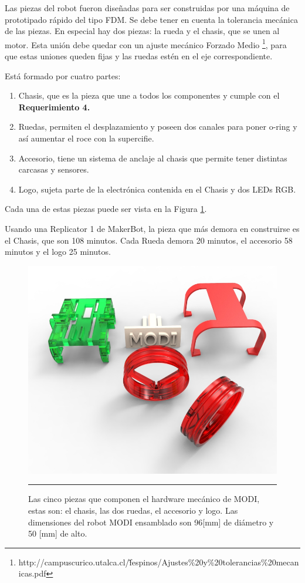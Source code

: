 Las piezas del robot fueron diseñadas para ser construidas por una máquina de prototipado rápido del tipo FDM. Se debe tener en cuenta la tolerancia mecánica de las piezas. En especial hay dos piezas: la rueda y el chasis, que se unen al motor. Esta unión debe quedar con un ajuste mecánico Forzado Medio \footnote{http://campuscurico.utalca.cl/\~ fespinos/Ajustes\%20y\%20tolerancias\%20mecanicas.pdf}, para que estas uniones queden fijas y las ruedas estén en el eje correspondiente.

Está formado por cuatro partes:

\begin{enumerate}
\item Chasis, que es la pieza que une a todos los componentes y cumple con el \textbf{Requerimiento 4.}
\item Ruedas, permiten el desplazamiento y poseen dos canales para poner o-ring y así aumentar el roce con la supercifie.
\item Accesorio, tiene un sistema de anclaje al chasis que permite tener distintas carcasas y sensores.
\item Logo,  sujeta parte de la electrónica contenida en el Chasis y dos LEDs RGB.
\end{enumerate}

Cada una de estas piezas puede ser vista en la Figura \ref{fig:Render Piezas 3D}.

Usando una Replicator 1 de MakerBot, la pieza que más demora en construirse es el Chasis, que son 108 minutos. Cada Rueda demora 20 minutos, el accesorio 58 minutos y el logo 25 minutos.

\begin{figure}[htbp]
	\centering
		\includegraphics[width=\textwidth]{./Figures/MODI/piezas.jpg}
		\rule{35em}{0.5pt}
	\caption[Piezas 3D]{Las cinco piezas que componen el hardware mecánico de MODI, estas son: el chasis, las dos ruedas, el accesorio y logo. Las dimensiones del robot MODI ensamblado son 96[mm] de diámetro y 50 [mm] de alto.}
	\label{fig:Render Piezas 3D}
\end{figure}

